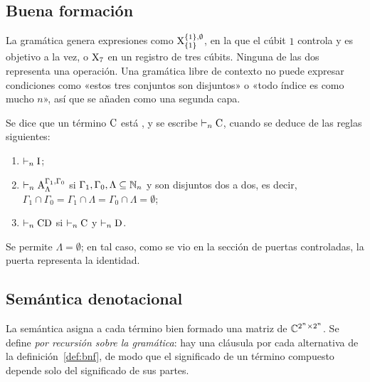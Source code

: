 \subsection{Buena formación}

La gramática genera expresiones como $\text{X}^{\{1\},\emptyset}_{\{1\}}$, en la que el cúbit $1$ controla y es objetivo a la vez, o $\text{X}_{7}$ en un registro de tres cúbits. Ninguna de las dos representa una operación. Una gramática libre de contexto no puede expresar condiciones como «estos tres conjuntos son disjuntos» o «todo índice es como mucho $n$», así que se añaden como una segunda capa.

\begin{definition}
  \label{def:buena-formacion}
  Se dice que un término $\text{C}$ está , y se escribe $\vdash_n \text{C}$, cuando se deduce de las reglas siguientes:
  \begin{enumerate}
    \item $\vdash_n \text{I}$;
    \item $\vdash_n \text{A}^{\Gamma_1,\Gamma_0}_{\Lambda}$ si $\Gamma_1,\Gamma_0,\Lambda\subseteq\mathbb{N}_n$ y son disjuntos dos a dos, es decir, $\Gamma_1\cap\Gamma_0=\Gamma_1\cap\Lambda=\Gamma_0\cap\Lambda=\emptyset$;
    \item $\vdash_n \text{C}\text{D}$ si $\vdash_n\text{C}$ y $\vdash_n\text{D}$.
  \end{enumerate}
\end{definition}

Se permite $\Lambda=\emptyset$; en tal caso, como se vio en la sección de puertas controladas, la puerta representa la identidad.

\subsection{Semántica denotacional}

La semántica asigna a cada término bien formado una matriz de $\mathbb{C}^{2^n\times 2^n}$. Se define \emph{por recursión sobre la gramática}: hay una cláusula por cada alternativa de la definición~\ref{def:bnf}, de modo que el significado de un término compuesto depende solo del significado de sus partes.

